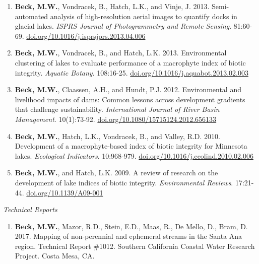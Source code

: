 \documentclass[letterpaper,12pt]{article}
\begin{document}
\begin{enumerate}
\item \textbf{Beck, M.W.}, Vondracek, B., Hatch, L.K., and Vinje, J. 2013. Semi-automated analysis of high-resolution aerial images to quantify docks in glacial lakes. \textit{ISPRS Journal of Photogrammetry and Remote Sensing}. 81:60-69. {\footnotesize\href{https://doi.org/10.1016/j.isprsjprs.2013.04.006}{doi.org/10.1016/j.isprsjprs.2013.04.006}}

\item \textbf{Beck, M.W.}, Vondracek, B., and Hatch, L.K. 2013. Environmental clustering of lakes to evaluate performance of a macrophyte index of biotic integrity. \textit{Aquatic Botany}. 108:16-25. {\footnotesize\href{https://doi.org/10.1016/j.aquabot.2013.02.003}{doi.org/10.1016/j.aquabot.2013.02.003}}

\item \textbf{Beck, M.W.}, Claassen, A.H., and Hundt, P.J. 2012. Environmental and livelihood impacts of dams: Common lessons across development gradients that challenge sustainability. \textit{International Journal of River Basin Management}. 10(1):73-92. {\footnotesize\href{http://dx.doi.org/10.1080/15715124.2012.656133}{doi.org/10.1080/15715124.2012.656133}}

\item \textbf{Beck, M.W.}, Hatch, L.K., Vondracek, B., and Valley, R.D. 2010. Development of a macrophyte-based index of biotic integrity for Minnesota lakes. \textit{Ecological Indicators}. 10:968-979. {\footnotesize\href{https://doi.org/10.1016/j.ecolind.2010.02.006}{doi.org/10.1016/j.ecolind.2010.02.006}}

\item \textbf{Beck, M.W.}, and Hatch, L.K. 2009. A review of research on the development of lake indices of biotic integrity. \textit{Environmental Reviews}. 17:21-44. {\footnotesize\href{https://doi.org/10.1139/A09-001}{doi.org/10.1139/A09-001}}

\end{enumerate}

\vspace{\baselineskip} 
\centerline{\large{\textit{Technical Reports}}}

\begin{enumerate}

\item \textbf{Beck, M.W.}, Mazor, R.D., Stein, E.D., Maas, R., De Mello, D., Bram, D. 2017. Mapping of non-perennial and ephemeral streams in the Santa Ana region. Technical Report \#1012. Southern California Coastal Water Research Project. Costa Mesa, CA.

\end{enumerate}
\end{document}
